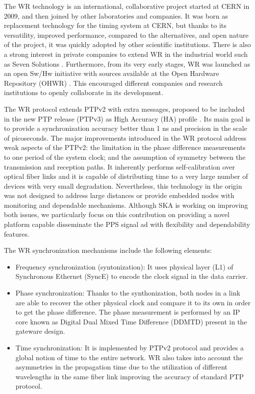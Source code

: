 The WR technology \cite{Wlostowski2011} is an international, collaborative project started at CERN in 2009, and then joined by other laboratories and companies. It was born as replacement technology for the timing system at CERN, but thanks to its versatility, improved performance, compared to the alternatives, and open nature of the project, it was quickly adopted by other scientific institutions. There is also a strong interest in private companies to extend WR in the industrial world such as Seven Solutions \cite{sevensols:wr}. Furthermore, from its very early stages, WR was launched as an open Sw/Hw initiative with sources available at the Open Hardware Repository (OHWR) \cite{ohwr:repo}. This encouraged different companies and research institutions to openly collaborate in its development.

The WR protocol extends PTPv2 with extra messages, proposed to be included in the new PTP release (PTPv3) as High Accuracy (HA) profile \cite{wr:maciej-ptpv3-standard}
. Its main goal is to provide a synchronization accuracy better than 1 ns and precision in the scale of picoseconds. The major improvements introduced in the WR protocol address weak aspects of the PTPv2: the limitation in the phase difference measurements to one period of the system clock; and the assumption of symmetry between the transmission and reception paths. It inherently performs self-calibration over optical fiber links and it is capable of distributing time to a very large number of devices with very small degradation. Nevertheless, this technology in the origin was not designed to address large distances or provide embedded nodes with monitoring and dependable mechanisms. Although SKA is working on improving both issues, we particularly focus on this contribution on providing a novel platform capable disseminate the PPS signal ad with flexibility and dependability features.  

The WR synchronization mechanisms include the following elements:

\begin{itemize}
	\item {Frequency synchronization (syntonization): It uses physical layer (L1) of Synchronous Ethernet (SyncE) to encode the clock signal in the data 
	carrier. }
	\item {Phase synchronization: Thanks to the synthonization, both nodes in a link are able to recover the other physical clock and compare it to its own in order to get the phase difference. The phase measurement is performed by an IP core known as Digital Dual Mixed Time Difference (DDMTD) present in the gateware design.}
	\item {Time synchronization: It is implemented by PTPv2 protocol and provides a global notion of time to the entire network. WR also takes into account the asymmetries in the propagation time due to the utilization of different wavelengths in the same fiber link improving the accuracy of standard PTP protocol.}
\end{itemize}

